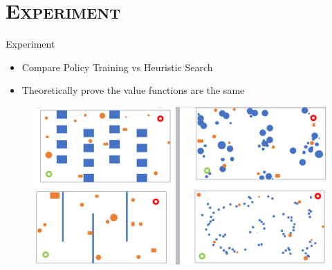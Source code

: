 \documentclass[xcolor=x11names,compress]{beamer}
\renewcommand{\(}{\begin{columns}}
\renewcommand{\)}{\end{columns}}
\newcommand{\<}[1]{\begin{column}{#1}}
\renewcommand{\>}{\end{column}}
\begin{document}
\section{\scshape Experiment}
\begin{frame}{Experiment}
\begin{itemize}
\item Compare Policy Training vs Heuristic Search
\item Theoretically prove the value functions are the same
\end{itemize}
\begin{figure}
\centering
\includegraphics[width=\textwidth]{./figures/exps.png}
\end{figure}
\end{frame}

\end{document}

